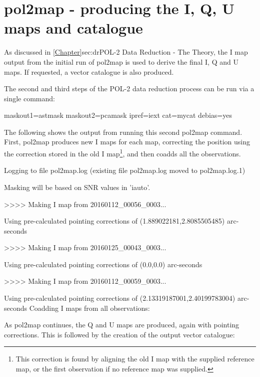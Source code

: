 \section{pol2map - producing the I, Q, U maps and catalogue}
\label{sec:how-step23}

As discussed in \cref{Chapter}{sec:dr}{POL-2 Data Reduction - The
  Theory}, the I map output from the initial run of pol2map is used to
derive the final I, Q and U maps. If requested, a vector catalogue is
also produced.

The second and third steps of the POL-2 data reduction process can be
run via a single command:

\begin{terminalv}
          maskout1=astmask maskout2=pcamask ipref=iext cat=mycat debias=yes
\end{terminalv}

The following shows the output from running this second pol2map
command. First, pol2map produces new I maps for each map, correcting
the position using the correction stored in the old I
map\footnote{This correction is found by aligning the old I map with the
supplied reference map, or the first observation if no reference map was
supplied.}, and then coadds all the observations.

\begin{terminalv}
Logging to file pol2map.log
(existing file pol2map.log moved to pol2map.log.1)

Masking will be based on SNR values in 'iauto'.

>>>>   Making I map from 20160112_00056_0003...

   Using pre-calculated pointing corrections of (1.889022181,2.8085505485) arc-seconds

>>>>   Making I map from 20160125_00043_0003...

   Using pre-calculated pointing corrections of (0.0,0.0) arc-seconds

>>>>   Making I map from 20160112_00059_0003...

   Using pre-calculated pointing corrections of (2.13319187001,2.40199783004) arc-seconds
Coadding I maps from all observations:
\end{terminalv}

As pol2map continues, the Q and U maps are produced, again with
pointing corrections. This is followed by the creation of the output
vector catalogue:

